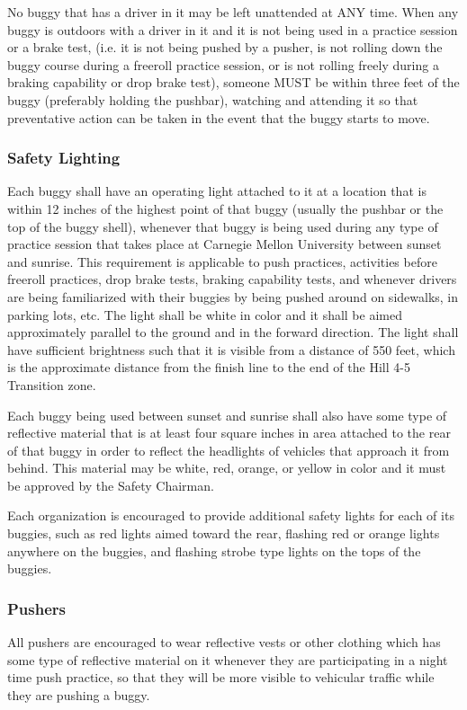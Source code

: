 No buggy that has a driver in it may be left unattended at ANY time. When any buggy is outdoors with a driver in it and it is not being used in a practice session or a brake test, (i.e. it is not being pushed by a pusher, is not rolling down the buggy course during a freeroll practice session, or is not rolling freely during a braking capability or drop brake test), someone MUST be within three feet of the buggy (preferably holding the pushbar), watching and attending it so that preventative action can be taken in the event that the buggy starts to move.

\subsubsection{Safety Lighting}

Each buggy shall have an operating light attached to it at a location that is within 12 inches of the highest point of that buggy (usually the pushbar or the top of the buggy shell), whenever that buggy is being used during any type of practice session that takes place at Carnegie Mellon University between sunset and sunrise. This requirement is applicable to push practices, activities before freeroll practices, drop brake tests, braking capability tests, and whenever drivers are being familiarized with their buggies by being pushed around on sidewalks, in parking lots, etc. The light shall be white in color and it shall be aimed approximately parallel to the ground and in the forward direction. The light shall have sufficient brightness such that it is visible from a distance of 550 feet, which is the approximate distance from the finish line to the end of the Hill 4-5 Transition zone.

Each buggy being used between sunset and sunrise shall also have some type of reflective material that is at least four square inches in area attached to the rear of that buggy in order to reflect the headlights of vehicles that approach it from behind. This material may be white, red, orange, or yellow in color and it must be approved by the Safety Chairman.

Each organization is encouraged to provide additional safety lights for each of its buggies, such as red lights aimed toward the rear, flashing red or orange lights anywhere on the buggies, and flashing strobe type lights on the tops of the buggies.

\subsubsection{Pushers}
All pushers are encouraged to wear reflective vests or other clothing which has some type of reflective material on it whenever they are participating in a night time push practice, so that they will be more visible to vehicular traffic while they are pushing a buggy.

